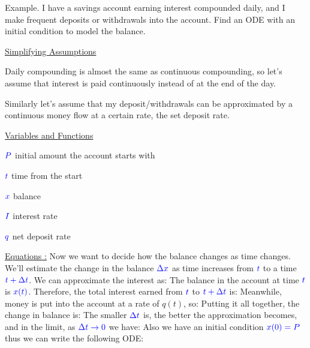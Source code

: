 \documentclass[11pt, openright]{book}
\begin{document}
\begin{dent}{Example.}
    I have a savings account earning interest compounded daily, and I make frequent deposits or withdrawals into the account. Find an ODE with an initial condition to model the balance.

    \uline{Simplifying Assumptions}
    \begin{items}{-10pt}{-10pt}
        \item Daily compounding is almost the same as continuous compounding, so let's assume that interest is paid continuously instead of at the end of the day.
        \item Similarly let's assume that my deposit/withdrawals can be approximated by a continuous money flow at a certain rate, the set deposit rate.
    \end{items}

    \uline{Variables and Functions}
    \begin{items}{-15pt}{-10pt}
        \item $\color{blue} P$ initial amount the account starts with
        \item $\color{blue} t$ time from the start
        \item $\color{blue} x$ balance
        \item $\color{blue} I$ interest rate
        \item $\color{blue} q$ net deposit rate
    \end{items}


    \uline{Equations :}\hspace{2mm} Now we want to decide how the balance changes as time changes. We'll estimate the change in the balance $\color{blue} \Delta x$ as time increases from $\color{blue} t$ to a time $\color{blue} t+ \Delta t$. We can approximate the interest as:
    The balance in the account at time $\color{blue} t$ is $\color{blue} x(t)$. Therefore, the total interest earned from $\color{blue} t$ to $\color{blue} t+\Delta t$ is:
    Meanwhile, money is put into the account at a rate of $q(t)$, so:
    Putting it all together, the change in balance is:
    The smaller $\color{blue} \Delta t$ is, the better the approximation becomes, and in the limit, as $\color{blue} \Delta t \to 0$ we have:
    Also we have an initial condition $\color{blue} x(0)=P$ thus we can write the following ODE:
\end{dent}
\end{document}
